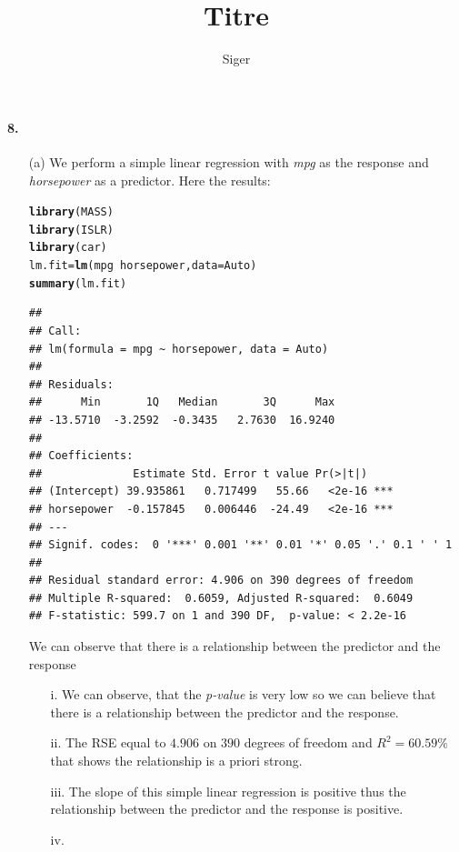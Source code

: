 \documentclass[a4paper, 10pt]{scrartcl}\usepackage[]{graphicx}\usepackage[]{color}
\title{Titre}
\author{Siger}
\makeatletter
\newcommand{\hlopt}[1]{\textcolor[rgb]{0,0,0}{#1}}%
\newcommand{\hlstd}[1]{\textcolor[rgb]{0.345,0.345,0.345}{#1}}%
\newcommand{\hlkwb}[1]{\textcolor[rgb]{0.69,0.353,0.396}{#1}}%
\newcommand{\hlkwc}[1]{\textcolor[rgb]{0.333,0.667,0.333}{#1}}%
\newcommand{\hlkwd}[1]{\textcolor[rgb]{0.737,0.353,0.396}{\textbf{#1}}}%
\newenvironment{kframe}{%
 \def\at@end@of@kframe{}%
 \ifinner\ifhmode%
  \def\at@end@of@kframe{\end{minipage}}%
  \begin{minipage}{\columnwidth}%
 \fi\fi%
 \def\FrameCommand##1{\hskip\@totalleftmargin \hskip-\fboxsep
 \colorbox{shadecolor}{##1}\hskip-\fboxsep
     \hskip-\linewidth \hskip-\@totalleftmargin \hskip\columnwidth}%
 \MakeFramed {\advance\hsize-\width
   \@totalleftmargin\z@ \linewidth\hsize
   \@setminipage}}%
 {\par\unskip\endMakeFramed%
 \at@end@of@kframe}
\newenvironment{knitrout}{}{} %
\makeatother
\begin{document}
\paragraph{8.}
\begin{itemize}
	\item[(a)] We perform a simple linear regression with \emph{
		mpg} as the response and \emph{horsepower} as a 
		predictor. Here the results:
\begin{knitrout}
\color{fgcolor}\begin{kframe}
\begin{alltt}
\hlkwd{library}\hlstd{(MASS)}
\hlkwd{library}\hlstd{(ISLR)}
\hlkwd{library}\hlstd{(car)}
\hlstd{lm.fit} \hlkwb{=} \hlkwd{lm}\hlstd{(mpg}\hlopt{~}\hlstd{horsepower,} \hlkwc{data}\hlstd{=Auto)}
\hlkwd{summary}\hlstd{(lm.fit)}
\end{alltt}
\begin{verbatim}
## 
## Call:
## lm(formula = mpg ~ horsepower, data = Auto)
## 
## Residuals:
##      Min       1Q   Median       3Q      Max 
## -13.5710  -3.2592  -0.3435   2.7630  16.9240 
## 
## Coefficients:
##              Estimate Std. Error t value Pr(>|t|)    
## (Intercept) 39.935861   0.717499   55.66   <2e-16 ***
## horsepower  -0.157845   0.006446  -24.49   <2e-16 ***
## ---
## Signif. codes:  0 '***' 0.001 '**' 0.01 '*' 0.05 '.' 0.1 ' ' 1
## 
## Residual standard error: 4.906 on 390 degrees of freedom
## Multiple R-squared:  0.6059,	Adjusted R-squared:  0.6049 
## F-statistic: 599.7 on 1 and 390 DF,  p-value: < 2.2e-16
\end{verbatim}
\end{kframe}
\end{knitrout}
We can observe that there is a relationship between the predictor and 
the response
		\begin{itemize}
			\item[i.] We can observe, that the \emph{
				p-value} is very low so we can believe
				that there is a relationship between
				the predictor and the response.
			\item[ii.] The RSE equal to $4.906$ on $390$
				degrees of freedom and $R^{2}=60.59\%$
				that shows the relationship is a priori
				strong.
			\item[iii.] The slope of this simple linear
				regression is positive thus the
				relationship between the predictor and
				the response is positive.
			\item[iv.]
\begin{knitrout}

\end{knitrout}
\end{itemize}
\end{itemize}
\end{document}
